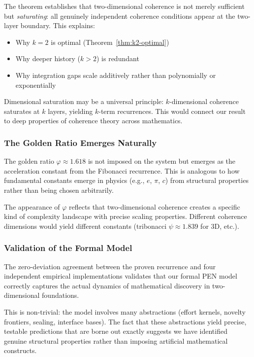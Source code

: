 \documentclass[11pt]{article}
\theoremstyle{definition}
\theoremstyle{remark}
\begin{document}
The theorem establishes that two-dimensional coherence is not merely sufficient but \emph{saturating}:
all genuinely independent coherence conditions appear at the two-layer boundary. This explains:
\begin{itemize}
\item Why $k=2$ is optimal (Theorem~\ref{thm:k2-optimal})
\item Why deeper history ($k>2$) is redundant
\item Why integration gaps scale additively rather than polynomially or exponentially
\end{itemize}

Dimensional saturation may be a universal principle: $k$-dimensional coherence saturates at $k$
layers, yielding $k$-term recurrences. This would connect our result to deep properties of coherence
theory across mathematics.

\subsubsection{The Golden Ratio Emerges Naturally}

The golden ratio $\varphi \approx 1.618$ is not imposed on the system but emerges as the acceleration
constant from the Fibonacci recurrence. This is analogous to how fundamental constants emerge in
physics (e.g., $e$, $\pi$, $c$) from structural properties rather than being chosen arbitrarily.

The appearance of $\varphi$ reflects that two-dimensional coherence creates a specific kind of
complexity landscape with precise scaling properties. Different coherence dimensions would yield
different constants (tribonacci $\psi \approx 1.839$ for 3D, etc.).

\subsubsection{Validation of the Formal Model}

The zero-deviation agreement between the proven recurrence and four independent empirical
implementations validates that our formal PEN model correctly captures the actual dynamics of
mathematical discovery in two-dimensional foundations.

This is non-trivial: the model involves many abstractions (effort kernels, novelty frontiers, sealing,
interface bases). The fact that these abstractions yield precise, testable predictions that are borne
out exactly suggests we have identified genuine structural properties rather than imposing artificial
mathematical constructs.
\end{document}

